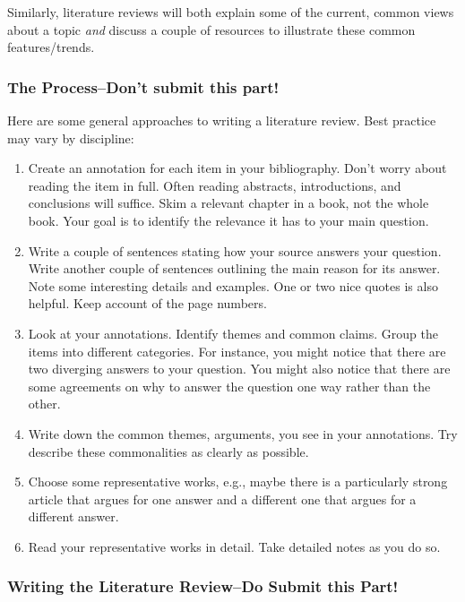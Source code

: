 \documentclass[]{article}
\begin{document}
Similarly, literature reviews will both explain some of the current,
common views about a topic \emph{and} discuss a couple of resources to
illustrate these common features/trends.

\subsubsection{The Process--Don't submit this
part!}\label{the-processdont-submit-this-part}

Here are some general approaches to writing a literature review. Best
practice may vary by discipline:

\begin{enumerate}
\def\labelenumi{\arabic{enumi}.}
\item
  Create an annotation for each item in your bibliography. Don't worry
  about reading the item in full. Often reading abstracts,
  introductions, and conclusions will suffice. Skim a relevant chapter
  in a book, not the whole book. Your goal is to identify the relevance
  it has to your main question.
\item
  Write a couple of sentences stating how your source answers your
  question. Write another couple of sentences outlining the main reason
  for its answer. Note some interesting details and examples. One or two
  nice quotes is also helpful. Keep account of the page numbers.
\item
  Look at your annotations. Identify themes and common claims. Group the
  items into different categories. For instance, you might notice that
  there are two diverging answers to your question. You might also
  notice that there are some agreements on why to answer the question
  one way rather than the other.
\item
  Write down the common themes, arguments, you see in your annotations.
  Try describe these commonalities as clearly as possible.
\item
  Choose some representative works, e.g., maybe there is a particularly
  strong article that argues for one answer and a different one that
  argues for a different answer.
\item
  Read your representative works in detail. Take detailed notes as you
  do so.
\end{enumerate}

\subsubsection{Writing the Literature Review--Do Submit this
Part!}\label{writing-the-literature-reviewdo-submit-this-part}
\end{document}
